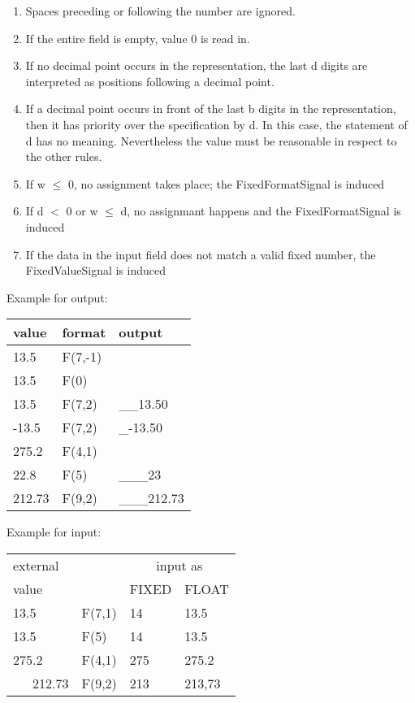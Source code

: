 \begin{added}
\begin{enumerate}
\begin{enumerate}
\item Spaces preceding or following the number are ignored.
\item If the entire field is empty, value 0 is read in.
\item If no decimal point occurs in the representation, the last d
digits are interpreted as positions following a decimal point.
\item If a decimal point occurs in front of the last b digits in the
representation, then it has priority over the specification by d. In
this case, the statement of d has no meaning. Nevertheless the value must
be reasonable in respect to the other rules. 
\item If w $\leq$ 0, no assignment takes place;
    the FixedFormatSignal is induced
\item If d $<$ 0 or w $\leq$ d, no assignmant happens and 
    the FixedFormatSignal is induced
\item If the data in the input field does not match a valid fixed 
   number, the FixedValueSignal is induced
\end{enumerate}
\end{enumerate}

Example for output:

\begin{tabular}{lll}
value  & format   & output \\ \hline
13.5   & F(7,-1)   &  \x \x {\em FixedFormatSignal!}  \\
13.5   & F(0)   &  \x \x {\em FixedFormatSignal!}  \\
13.5   & F(7,2)   & \_\_13.50  \\
-13.5   & F(7,2)   & \_-13.50  \\
275.2  & F(4,1)   &  \x \x {\em FixedValueSignal!} \\
22.8   & F(5)     & \_\_\_23 \\
212.73 & F(9,2)   & \_\_\_212.73 \\
\end{tabular}
\end{added}

\begin{added}
Example for input:

\begin{tabular}{llll}
external       &          & \multicolumn{2}{c}{input as}  \\ 
value       &          & FIXED & FLOAT  \\ \hline
13.5   & F(7,1)   &  14 & 13.5   \\
13.5   & F(5)     &  14 & 13.5   \\
275.2  & F(4,1)   & 275 & 275.2 \\
\ \ \ 212.73 &  F(9,2)&  213 & 213,73 \\
\end{tabular}

\end{added}

